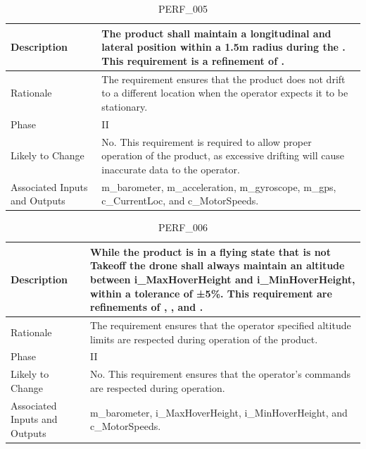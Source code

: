 \documentclass{article}
\begin{document}
\begin{table}[!h]
\begin{center}
\caption {PERF\_005} 
\label{PERF_005}
\begin{tabular}{ | m{3cm} | m{11cm} | }
\hline
Description & The product shall maintain a longitudinal and lateral position within a 1.5m radius during the \nameref{Hover State}. This requirement is a refinement of \nameref{STA_001}. \\
\hline
Rationale & The requirement ensures that the product does not drift to a different location when the operator expects it to be stationary. \\
\hline
Phase & II \\
\hline
Likely to Change & No. This requirement is required to allow proper operation of the product, as excessive drifting will cause inaccurate data to the operator. \\
\hline
Associated Inputs and Outputs & m\_barometer, m\_acceleration, m\_gyroscope, m\_gps, c\_CurrentLoc, and c\_MotorSpeeds.  \\
\hline
\end{tabular}
\end{center}
\end{table}

\begin{table}[!h]
\begin{center}
\caption {PERF\_006} 
\label{PERF_006}
\begin{tabular}{ | m{3cm} | m{11cm} | }
\hline
Description & While the product is in a flying state that is not Takeoff the drone shall always maintain an altitude between i\_MaxHoverHeight and i\_MinHoverHeight, within a tolerance of ±5\%. This requirement are refinements of \nameref{STA_001}, \nameref{STA_011}, \nameref{STA_011} and \nameref{STA_003}.  \\
\hline
Rationale & The requirement ensures that the operator specified altitude limits are respected during operation of the product. \\
\hline
Phase & II \\
\hline
Likely to Change & No. This requirement ensures that the operator's commands are respected during operation. \\
\hline
Associated Inputs and Outputs & m\_barometer, i\_MaxHoverHeight, i\_MinHoverHeight, and c\_MotorSpeeds.  \\
\hline
\end{tabular}
\end{center}
\end{table}
\end{document}
